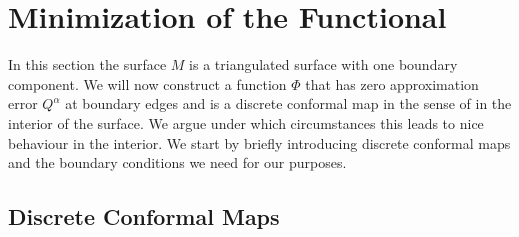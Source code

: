 \documentclass[twoside]{article}
\begin{document}
%

\section{Minimization of the Functional}
\label{sec:algorithm}

In this section the surface $M$ is a triangulated surface with one boundary
component. We will now construct a function $\Phi$ that
has zero approximation error $Q^\alpha$ at boundary edges and is a discrete
conformal map in the sense of \cite{Springborn:2008:CET} in the interior of the
surface. We argue under which circumstances this leads to nice
behaviour in the interior. We start by briefly introducing discrete conformal
maps and the boundary conditions we need for our purposes.

\subsection{Discrete Conformal Maps}
\end{document}
